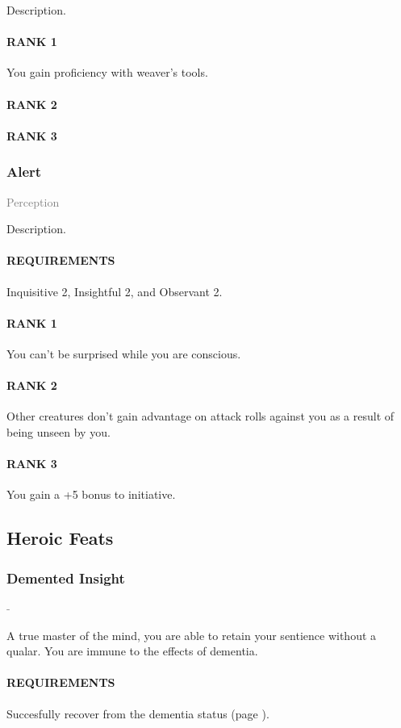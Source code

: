 \normalsize
Description.
\paragraph{RANK 1} You gain proficiency with weaver's tools.
\paragraph{RANK 2}
\paragraph{RANK 3}

\subsubsection{Alert} \label{feat::alert}
\small{\textcolor{gray}{Perception}}

\normalsize
Description.
\paragraph{REQUIREMENTS} Inquisitive 2, Insightful 2, and Observant 2.
\paragraph{RANK 1} You can't be surprised while you are conscious.
\paragraph{RANK 2} Other creatures don't gain advantage on attack rolls against you as a result of being unseen by you.
\paragraph{RANK 3} You gain a +5 bonus to initiative.

\subsection*{Heroic Feats}
\subsubsection{Demented Insight} \label{feat::dementedinsight}
\small{\textcolor{gray}{-}}

\normalsize
A true master of the mind, you are able to retain your sentience without a qualar.
You are immune to the effects of dementia.
\paragraph{REQUIREMENTS} Succesfully recover from the dementia status (page \pageref{ssec::dementia}).
